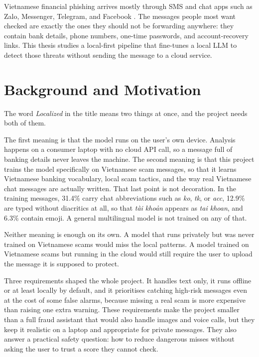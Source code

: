 Vietnamese financial phishing arrives mostly through SMS and chat apps such as Zalo, Messenger, Telegram, and Facebook \cite{groupib2022laser,ais2024biometricwarning}. The messages people most want checked are exactly the ones they should not be forwarding anywhere: they contain bank details, phone numbers, one-time passwords, and account-recovery links. This thesis studies a local-first pipeline that fine-tunes a local LLM to detect those threats without sending the message to a cloud service.

\section{Background and Motivation}
The word \textit{Localized} in the title means two things at once, and the project needs both of them.

The first meaning is that the model runs on the user's own device. Analysis happens on a consumer laptop with no cloud API call, so a message full of banking details never leaves the machine. The second meaning is that this project trains the model specifically on Vietnamese scam messages, so that it learns Vietnamese banking vocabulary, local scam tactics, and the way real Vietnamese chat messages are actually written. That last point is not decoration. In the training messages, 31.4\% carry chat abbreviations such as \textit{ko}, \textit{tk}, or \textit{acc}, 12.9\% are typed without diacritics at all, so that \textit{tài khoản} appears as \textit{tai khoan}, and 6.3\% contain emoji. A general multilingual model is not trained on any of that.

Neither meaning is enough on its own. A model that runs privately but was never trained on Vietnamese scams would miss the local patterns. A model trained on Vietnamese scams but running in the cloud would still require the user to upload the message it is supposed to protect.

Three requirements shaped the whole project. It handles text only, it runs offline or at least locally by default, and it prioritises catching high-risk messages even at the cost of some false alarms, because missing a real scam is more expensive than raising one extra warning. These requirements make the project smaller than a full fraud assistant that would also handle images and voice calls, but they keep it realistic on a laptop and appropriate for private messages. They also answer a practical safety question: how to reduce dangerous misses without asking the user to trust a score they cannot check.

